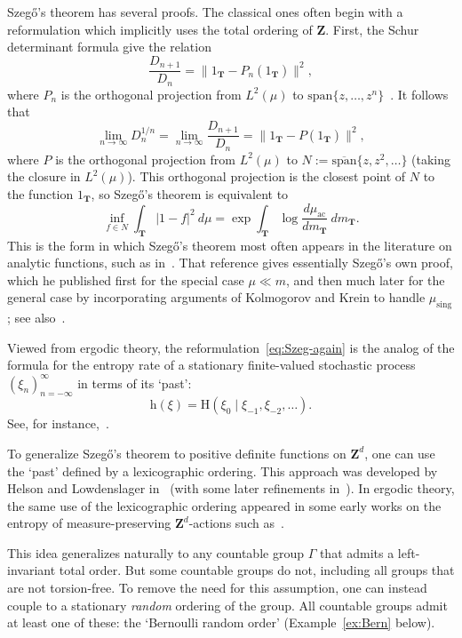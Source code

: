 \documentclass[12pt,a4paper]{article}
\numberwithin{equation}{section}
\theoremstyle{remark}
\renewcommand{\rm}[1]{\mathrm{#1}}
\newcommand{\bbT}{\mathbf{T}}
\newcommand{\bbZ}{\mathbf{Z}}
\newcommand{\rmH}{\mathrm{H}}
\newcommand{\rmh}{\mathrm{h}}
\newcommand{\G}{\Gamma}
\begin{document}
Szeg\H{o}'s theorem has several proofs.  The classical ones often begin with a reformulation which implicitly uses the total ordering of $\bbZ$.  First, the Schur determinant formula give the relation
\[\frac{D_{n+1}}{D_n} = \|1_\bbT - P_n(1_\bbT)\|^2,\]
where $P_n$ is the orthogonal projection from $L^2(\mu)$ to $\rm{span}\{z, \dots, z^n\}$~\cite[Thm. 1.5.11]{SimOPUCI}.  It follows that
\[\lim_{n\to\infty}D_n^{1/n} = \lim_{n\to\infty}\frac{D_{n+1}}{D_n} = \|1_\bbT - P(1_\bbT)\|^2,\]
where $P$ is the orthogonal projection from $L^2(\mu)$ to $N := \overline{\rm{span}}\{z, z^2,\dots\}$ (taking the closure in $L^2(\mu)$).  This orthogonal projection is the closest point of $N$ to the function $1_\bbT$, so Szeg\H{o}'s theorem is equivalent to
\begin{equation}\label{eq:Szeg-again}
\inf_{f \in N}\int_\bbT |1-f|^2\ d\mu = \exp\int_\bbT \log\frac{d\mu_{\rm{ac}}}{dm_\bbT}\ dm_\bbT.
\end{equation}
This is the form in which Szeg\H{o}'s theorem most often appears in the literature on analytic functions, such as in~\cite[Sec. V.8]{GameUA}.  That reference gives essentially Szeg\H{o}'s own proof, which he published first for the special case $\mu \ll m$, and then much later for the general case by incorporating arguments of Kolmogorov and Krein to handle $\mu_{\rm{sing}}$; see also~\cite[Secs. 2.4--5]{SimOPUCI}.

Viewed from ergodic theory, the reformulation~\eqref{eq:Szeg-again} is the analog of the formula for the entropy rate of a stationary finite-valued stochastic process $(\xi_n)_{n=-\infty}^\infty$ in terms of its `past':
\begin{equation}\label{eq:entropy-past}
\rmh(\xi) = \rmH(\xi_0\mid \xi_{-1},\xi_{-2},\dots).
\end{equation}
See, for instance,~\cite[Thm. 4.14]{Walters--book}.

To generalize Szeg\H{o}'s theorem to positive definite functions on $\bbZ^d$, one can use the `past' defined by a lexicographic ordering.  This approach was developed by Helson and Lowdenslager in~\cite{HelLow58,HelLow61} (with some later refinements in~\cite{Lyons03}).  In ergodic theory, the same use of the lexicographic ordering appeared in some early works on the entropy of measure-preserving $\bbZ^d$-actions such as~\cite{Con7273,KatzWei72}.

This idea generalizes naturally to any countable group $\G$ that admits a left-invariant total order.  But some countable groups do not, including all groups that are not torsion-free.  To remove the need for this assumption, one can instead couple to a stationary \emph{random} ordering of the group.  All countable groups admit at least one of these: the `Bernoulli random order' (Example~\ref{ex:Bern} below).
\end{document}

